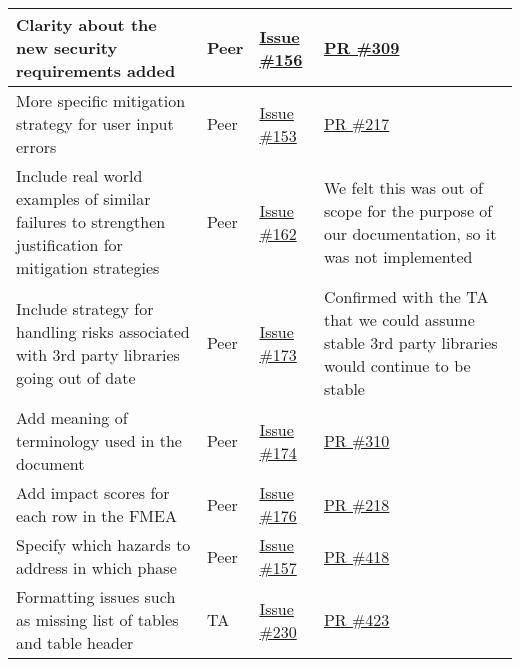 \documentclass{article}
\begin{document}
\begin{longtable}{|p{5cm}|p{1.5cm}|p{2cm}|p{5cm}|}
Clarity about the new security requirements added & Peer & \href{https://github.com/OKKM-insights/OKKM.insights/issues/156}{Issue \#156} & \href{https://github.com/OKKM-insights/OKKM.insights/pull/309}{PR \#309} \\ \hline
More specific mitigation strategy for user input errors & Peer & \href{https://github.com/OKKM-insights/OKKM.insights/issues/153}{Issue \#153} & \href{https://github.com/OKKM-insights/OKKM.insights/pull/217}{PR \#217} \\ \hline
Include real world examples of similar failures to strengthen justification for mitigation strategies & Peer & \href{https://github.com/OKKM-insights/OKKM.insights/issues/162}{Issue \#162} & We felt this was out of scope for the purpose of our documentation, so it was not implemented \\ \hline
Include strategy for handling risks associated with 3rd party libraries going out of date & Peer & \href{https://github.com/OKKM-insights/OKKM.insights/issues/173}{Issue \#173} & Confirmed with the TA that we could assume stable 3rd party libraries would continue to be stable \\ \hline
Add meaning of terminology used in the document & Peer & \href{https://github.com/OKKM-insights/OKKM.insights/issues/174}{Issue \#174} & \href{https://github.com/OKKM-insights/OKKM.insights/pull/310}{PR \#310} \\ \hline
Add impact scores for each row in the FMEA & Peer & \href{https://github.com/OKKM-insights/OKKM.insights/issues/176}{Issue \#176} & \href{https://github.com/OKKM-insights/OKKM.insights/pull/218}{PR \#218} \\ \hline
Specify which hazards to address in which phase & Peer & \href{https://github.com/OKKM-insights/OKKM.insights/issues/157}{Issue \#157} & \href{https://github.com/OKKM-insights/OKKM.insights/pull/418}{PR \#418} \\ \hline
Formatting issues such as missing list of tables and table header & TA & \href{https://github.com/OKKM-insights/OKKM.insights/issues/230}{Issue \#230} & \href{https://github.com/OKKM-insights/OKKM.insights/pull/423}{PR \#423} \\ \hline
\end{longtable}
\end{document}
